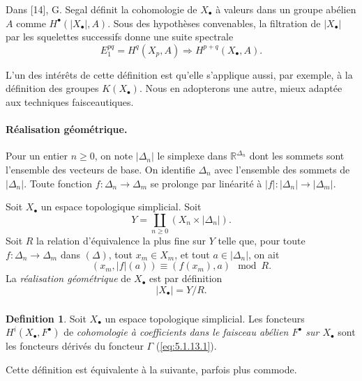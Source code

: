 \documentclass[11pt]{amsart}
\theoremstyle{plain}
\theoremstyle{definition}
\newtheorem{definition}[theorem]{Definition}
\newcommand{\RR}{\mathbb{R}}
\begin{document}
Dans [14], G. Segal d\'efinit la cohomologie de $X_\bullet$ \`a valeurs dans un groupe ab\'elien $A$ comme $H^\bullet(|X_\bullet|, A)$. Sous des hypoth\`eses convenables, la filtration de $|X_\bullet|$ par les squelettes successifs donne une suite spectrale
\begin{equation}\label{eq:5.2.1.1}
E_1^{pq} = H^q(X_p, A) \Rightarrow H^{p+q}(X_\bullet, A).
\end{equation}

L'un des int\'er\^ets de cette d\'efinition est qu'elle s'applique aussi, par exemple, \`a la d\'efinition des groupes $K(X_\bullet)$. Nous en adopterons une autre, mieux adapt\'ee aux techniques faisceautiques.

\paragraph{R\'ealisation g\'eom\'etrique.}
Pour un entier $n \geq 0$, on note $|\Delta_n|$ le simplexe dans $\RR^{\Delta_n}$ dont les sommets sont l'ensemble des vecteurs de base. On identifie $\Delta_n$ avec l'ensemble des sommets de $|\Delta_n|$. Toute fonction $f : \Delta_n \to \Delta_m$ se prolonge par lin\'earit\'e \`a $|f| : |\Delta_n| \to |\Delta_m|$.

Soit $X_\bullet$ un espace topologique simplicial. Soit
\[
Y = \coprod_{n \geq 0} (X_n \times |\Delta_n|).
\]
Soit $R$ la relation d'\'equivalence la plus fine sur $Y$ telle que, pour toute $f : \Delta_n \to \Delta_m$ dans $(\Delta)$, tout $x_m \in X_m$, et tout $a \in |\Delta_n|$, on ait
\[
(x_m, |f|(a)) \equiv (f(x_m), a) \mod R.
\]
La \emph{r\'ealisation g\'eom\'etrique} de $X_\bullet$ est par d\'efinition
\[
|X_\bullet| = Y/R.
\]

\subsubsection{}
\begin{definition}
Soit $X_\bullet$ un espace topologique simplicial. Les foncteurs $H^i(X_\bullet, F^\bullet)$ de \emph{cohomologie \`a coefficients dans le faisceau ab\'elien $F^\bullet$ sur $X_\bullet$} sont les foncteurs d\'eriv\'es du foncteur $\Gamma$ (\eqref{eq:5.1.13.1}).
\end{definition}

Cette d\'efinition est \'equivalente \`a la suivante, parfois plus commode.
\end{document}
